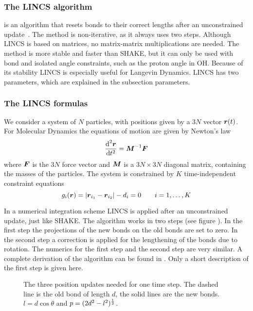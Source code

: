 \newcommand{\fs}[1]{\begin{equation} \label{eqn:#1}}
\newcommand{\fe}{\end{equation}}
\newcommand{\p}{\partial}
\newcommand{\Bm}{\ve{B}}
\newcommand{\M}{\ve{M}}
\newcommand{\iM}{\M^{-1}}
\newcommand{\Tm}{\ve{T}}
\newcommand{\Sm}{\ve{S}}
\newcommand{\fo}{\ve{f}}
\newcommand{\con}{\ve{g}}
\newcommand{\lenc}{\ve{d}}

\subsubsection*{The LINCS algorithm}
 is an algorithm that resets bonds to their correct lengths
after an unconstrained update~\cite{Hess97}. 
The method is non-iterative, as it always uses two steps.
Although LINCS is based on matrices, no matrix-matrix multiplications are 
needed. The method is more stable and faster than SHAKE, 
but it can only be used with bond  and 
isolated angle constraints, such as the proton angle in OH. 
Because of its stability LINCS is especially useful for Langevin Dynamics. 
LINCS has two parameters, which are explained in the subsection parameters.
 
\subsubsection*{The LINCS formulas}
We consider a system of $N$ particles, with positions given by a
$3N$ vector $\mbox{\boldmath ${r}$}(t)$.
For Molecular Dynamics the equations of motion are given by Newton's law
\fs{c1}
{\de^2 \ve{r} \over \de t^2} = \iM \ve{F}
\fe
where $\mbox{\boldmath ${F}$}$ is the $3N$ force vector 
and $\M$ is a $3N \times 3N$ diagonal matrix,
containing the masses of the particles.
The system is constrained by $K$ time-independent constraint equations
\fs{c2}
g_i(\ve{r}) = | \ve{r}_{i_1}-\ve{r}_{i_2} | - d_i = 0 ~~~~~~i=1,\ldots,K
\fe

In a numerical integration scheme LINCS is applied after an
unconstrained update, just like SHAKE. The algorithm works in two
steps (see figure ). In the first step the projections
of the new bonds on the old bonds are set to zero. In the second step
a correction is applied for the lengthening of the bonds due to
rotation. The numerics for the first step and the second step are very
similar. A complete derivation of the algorithm can be found in
\cite{Hess97}. Only a short description of the first step is given
here.

\begin{figure}
\centerline{}
\caption[The three position updates needed for one time step.]{The
three position updates needed for one time step. The dashed line is
the old bond of length $d$, the solid lines are the new bonds. $l=d
\cos \theta$ and $p=(2 d^2 - l^2)^{1 \over 2}$.}
\label{fig:lincs}
\end{figure}

